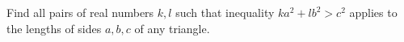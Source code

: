 Find all pairs of real numbers $k, l$ such that inequality $ka^2 + lb^2> c^2$ applies to the lengths of sides $a, b, c$ of any triangle.